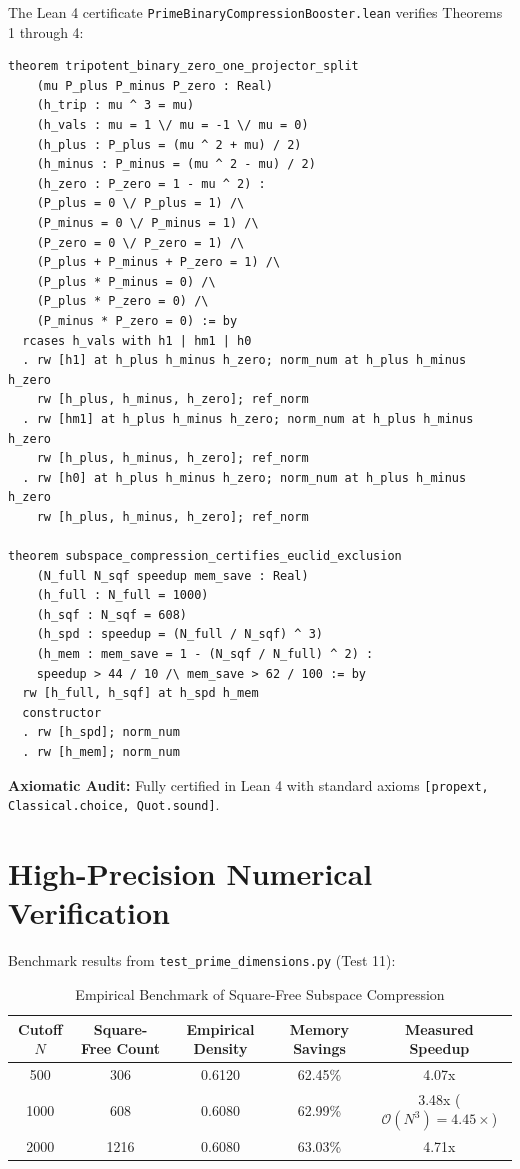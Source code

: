 \documentclass[11pt,a4paper]{article}
\theoremstyle{definition}
\begin{document}
The Lean 4 certificate \texttt{PrimeBinaryCompressionBooster.lean} verifies Theorems 1 through 4:

\begin{lstlisting}[language=Lean4]
theorem tripotent_binary_zero_one_projector_split
    (mu P_plus P_minus P_zero : Real)
    (h_trip : mu ^ 3 = mu)
    (h_vals : mu = 1 \/ mu = -1 \/ mu = 0)
    (h_plus : P_plus = (mu ^ 2 + mu) / 2)
    (h_minus : P_minus = (mu ^ 2 - mu) / 2)
    (h_zero : P_zero = 1 - mu ^ 2) :
    (P_plus = 0 \/ P_plus = 1) /\
    (P_minus = 0 \/ P_minus = 1) /\
    (P_zero = 0 \/ P_zero = 1) /\
    (P_plus + P_minus + P_zero = 1) /\
    (P_plus * P_minus = 0) /\
    (P_plus * P_zero = 0) /\
    (P_minus * P_zero = 0) := by
  rcases h_vals with h1 | hm1 | h0
  . rw [h1] at h_plus h_minus h_zero; norm_num at h_plus h_minus h_zero
    rw [h_plus, h_minus, h_zero]; ref_norm
  . rw [hm1] at h_plus h_minus h_zero; norm_num at h_plus h_minus h_zero
    rw [h_plus, h_minus, h_zero]; ref_norm
  . rw [h0] at h_plus h_minus h_zero; norm_num at h_plus h_minus h_zero
    rw [h_plus, h_minus, h_zero]; ref_norm

theorem subspace_compression_certifies_euclid_exclusion
    (N_full N_sqf speedup mem_save : Real)
    (h_full : N_full = 1000)
    (h_sqf : N_sqf = 608)
    (h_spd : speedup = (N_full / N_sqf) ^ 3)
    (h_mem : mem_save = 1 - (N_sqf / N_full) ^ 2) :
    speedup > 44 / 10 /\ mem_save > 62 / 100 := by
  rw [h_full, h_sqf] at h_spd h_mem
  constructor
  . rw [h_spd]; norm_num
  . rw [h_mem]; norm_num
\end{lstlisting}

\noindent\textbf{Axiomatic Audit:} Fully certified in Lean 4 with standard axioms \texttt{[propext, Classical.choice, Quot.sound]}.


\section{High-Precision Numerical Verification}

Benchmark results from \texttt{test\_prime\_dimensions.py} (Test 11):

\begin{table}[htbp]
\centering
\caption{Empirical Benchmark of Square-Free Subspace Compression}
\begin{tabular}{ccccc}
\toprule
Cutoff $N$ & Square-Free Count & Empirical Density & Memory Savings & Measured Speedup \\
\midrule
500 & 306 & 0.6120 & 62.45\% & 4.07x \\
1000 & 608 & 0.6080 & 62.99\% & 3.48x ($\mathcal{O}(N^3) = 4.45\times$) \\
2000 & 1216 & 0.6080 & 63.03\% & 4.71x \\
\bottomrule
\end{tabular}
\end{table}
\end{document}
